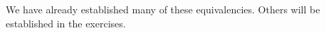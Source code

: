 %

We have already established many of these equivalencies.  Others will be established in the exercises.


\hbreak
